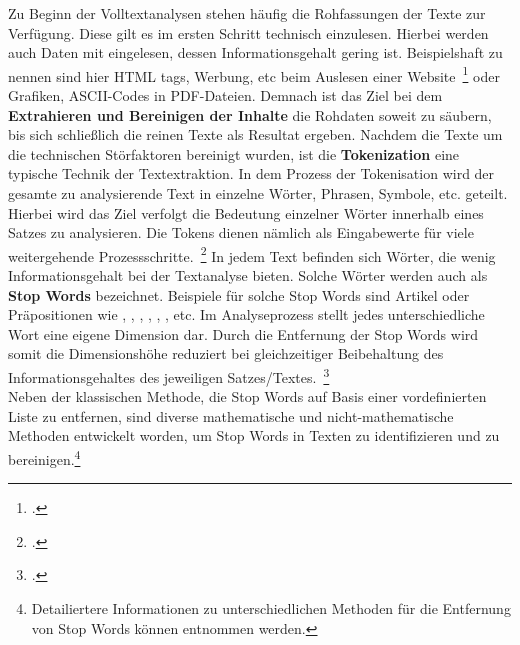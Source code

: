 Zu Beginn der Volltextanalysen stehen häufig die Rohfassungen der Texte zur Verfügung.
Diese gilt es im ersten Schritt technisch einzulesen.
Hierbei werden auch Daten mit eingelesen, dessen Informationsgehalt gering ist.
Beispielshaft zu nennen sind hier HTML tags, Werbung, etc beim Auslesen einer Website~\footcite[\vglf][]
{pahwa.2018} oder Grafiken, ASCII-Codes in PDF-Dateien.
Demnach ist das Ziel bei dem \textbf{Extrahieren und Bereinigen
der Inhalte} die Rohdaten soweit zu säubern, bis sich schließlich die reinen Texte als Resultat ergeben.
Nachdem die Texte um die technischen Störfaktoren bereinigt wurden, ist die \textbf{Tokenization} eine typische Technik
der Textextraktion.
In dem Prozess der Tokenisation wird der gesamte zu analysierende Text in einzelne Wörter, Phrasen,
Symbole, etc.
geteilt.
Hierbei wird das Ziel verfolgt die Bedeutung einzelner Wörter innerhalb eines Satzes zu analysieren.
Die Tokens dienen nämlich als Eingabewerte für viele weitergehende Prozessschritte.~\footcite[\vglf][]
{gurusamy.2014}
In jedem Text befinden sich Wörter, die wenig Informationsgehalt bei der Textanalyse bieten.
Solche Wörter werden auch als \textbf{Stop Words} bezeichnet.
Beispiele für solche Stop Words sind Artikel oder
Präpositionen wie \grqq, \grqq, \grqq, \grqq,
\grqq, \grqq, etc.
Im Analyseprozess stellt jedes unterschiedliche Wort eine eigene Dimension dar.
Durch die Entfernung der Stop Words wird somit die Dimensionshöhe reduziert bei gleichzeitiger Beibehaltung des
Informationsgehaltes des jeweiligen Satzes/Textes.~\footcite[\vglf][]{mohan.2015}\\
Neben der klassischen Methode, die Stop Words auf Basis einer vordefinierten Liste zu entfernen, sind diverse
mathematische und nicht-mathematische Methoden entwickelt worden, um Stop Words in Texten zu identifizieren und zu
bereinigen.\footnote{Detailiertere Informationen zu unterschiedlichen Methoden für die Entfernung von Stop Words
können{}\cite{mohan.2015} entnommen werden.}\\

